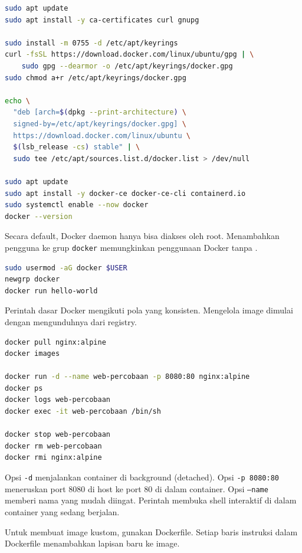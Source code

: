 \begin{lstlisting}[language=bash, caption={Instalasi Docker Engine di Ubuntu}]
sudo apt update
sudo apt install -y ca-certificates curl gnupg

sudo install -m 0755 -d /etc/apt/keyrings
curl -fsSL https://download.docker.com/linux/ubuntu/gpg | \
    sudo gpg --dearmor -o /etc/apt/keyrings/docker.gpg
sudo chmod a+r /etc/apt/keyrings/docker.gpg

echo \
  "deb [arch=$(dpkg --print-architecture) \
  signed-by=/etc/apt/keyrings/docker.gpg] \
  https://download.docker.com/linux/ubuntu \
  $(lsb_release -cs) stable" | \
  sudo tee /etc/apt/sources.list.d/docker.list > /dev/null

sudo apt update
sudo apt install -y docker-ce docker-ce-cli containerd.io
sudo systemctl enable --now docker
docker --version
\end{lstlisting}

Secara default, Docker daemon hanya bisa diakses oleh root. Menambahkan pengguna
ke grup \texttt{docker} memungkinkan penggunaan Docker tanpa .

\begin{lstlisting}[language=bash, caption={Mengizinkan user menggunakan Docker tanpa sudo}]
sudo usermod -aG docker $USER
newgrp docker
docker run hello-world
\end{lstlisting}

Perintah dasar Docker mengikuti pola yang konsisten. Mengelola image dimulai
dengan mengunduhnya dari registry.

\begin{lstlisting}[language=bash, caption={Mengelola image dan menjalankan container}]
docker pull nginx:alpine
docker images

docker run -d --name web-percobaan -p 8080:80 nginx:alpine
docker ps
docker logs web-percobaan
docker exec -it web-percobaan /bin/sh

docker stop web-percobaan
docker rm web-percobaan
docker rmi nginx:alpine
\end{lstlisting}

Opsi \texttt{-d} menjalankan container di background (detached). Opsi \texttt{-p
8080:80} meneruskan port 8080 di host ke port 80 di dalam container. Opsi
\texttt{--name} memberi nama yang mudah diingat. Perintah 
membuka shell interaktif di dalam container yang sedang berjalan.

Untuk membuat image kustom, gunakan Dockerfile. Setiap baris instruksi dalam
Dockerfile menambahkan lapisan baru ke image.


